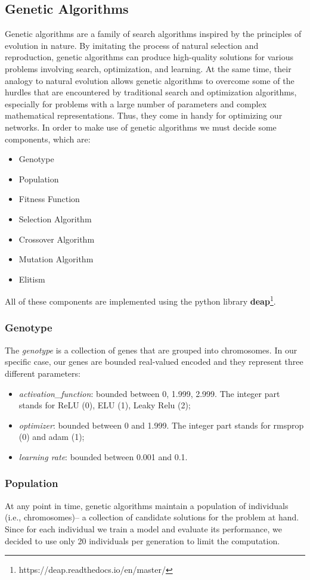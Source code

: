 \subsection{Genetic Algorithms}
Genetic algorithms are a family of search algorithms inspired by the principles of evolution in nature. By imitating the process of natural selection and reproduction, genetic algorithms can produce high-quality solutions for various problems involving search, optimization, and learning. At the same time, their analogy to natural evolution allows genetic algorithms to overcome some of the hurdles that are encountered by traditional search and optimization algorithms, especially for problems with a large number of parameters and complex mathematical representations. Thus, they come in handy for optimizing our networks.
In order to make use of genetic algorithms we must decide some components, which are:
\begin{itemize}
\item Genotype
\item Population
\item Fitness Function
\item Selection Algorithm
\item Crossover Algorithm
\item Mutation Algorithm
\item Elitism
\end{itemize}
All of these components are implemented using the python library \textbf{deap}\footnote{https://deap.readthedocs.io/en/master/}.

\subsubsection{Genotype}
The \textit{genotype} is a collection of genes that are grouped into chromosomes. In our specific case, our genes are bounded real-valued encoded and they represent three different parameters:
\begin{itemize}
\item \textit{activation\_function}: bounded between 0, 1.999, 2.999. The integer part stands for ReLU (0), ELU (1), Leaky Relu (2);
\item \textit{optimizer}: bounded between 0 and 1.999. The integer part stands for rmsprop (0) and adam (1);
\item \textit{learning rate}: bounded between 0.001 and 0.1.
\end{itemize}

\subsubsection{Population}
At any point in time, genetic algorithms maintain a population of individuals (i.e., chromosomes)– a collection of candidate solutions for the problem at hand. Since for each individual we train a model and evaluate its performance, we decided to use only 20 individuals per generation to limit the computation.

